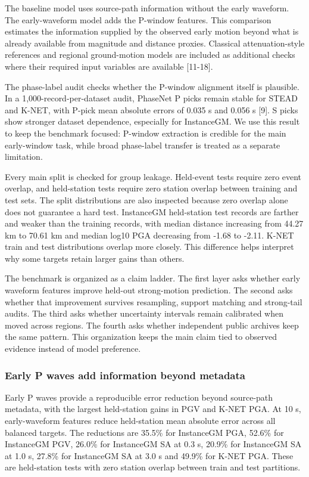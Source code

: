 \documentclass[
  10pt,
]{article}
\begin{document}
The baseline model uses source-path information without the early
waveform. The early-waveform model adds the P-window features. This
comparison estimates the information supplied by the observed early
motion beyond what is already available from magnitude and distance
proxies. Classical attenuation-style references and regional
ground-motion models are included as additional checks where their
required input variables are available {[}11-18{]}.

The phase-label audit checks whether the P-window alignment itself is
plausible. In a 1,000-record-per-dataset audit, PhaseNet P picks remain
stable for STEAD and K-NET, with P-pick mean absolute errors of 0.035 s
and 0.056 s {[}9{]}. S picks show stronger dataset dependence,
especially for InstanceGM. We use this result to keep the benchmark
focused: P-window extraction is credible for the main early-window task,
while broad phase-label transfer is treated as a separate limitation.

Every main split is checked for group leakage. Held-event tests require
zero event overlap, and held-station tests require zero station overlap
between training and test sets. The split distributions are also
inspected because zero overlap alone does not guarantee a hard test.
InstanceGM held-station test records are farther and weaker than the
training records, with median distance increasing from 44.27 km to 70.61
km and median log10 PGA decreasing from -1.68 to -2.11. K-NET train and
test distributions overlap more closely. This difference helps interpret
why some targets retain larger gains than others.

The benchmark is organized as a claim ladder. The first layer asks
whether early waveform features improve held-out strong-motion
prediction. The second asks whether that improvement survives
resampling, support matching and strong-tail audits. The third asks
whether uncertainty intervals remain calibrated when moved across
regions. The fourth asks whether independent public archives keep the
same pattern. This organization keeps the main claim tied to observed
evidence instead of model preference.

\subsubsection{Early P waves add information beyond
metadata}\label{early-p-waves-add-information-beyond-metadata}

Early P waves provide a reproducible error reduction beyond source-path
metadata, with the largest held-station gains in PGV and K-NET PGA. At
10 s, early-waveform features reduce held-station mean absolute error
across all balanced targets. The reductions are 35.5\% for InstanceGM
PGA, 52.6\% for InstanceGM PGV, 26.0\% for InstanceGM SA at 0.3 s,
20.9\% for InstanceGM SA at 1.0 s, 27.8\% for InstanceGM SA at 3.0 s and
49.9\% for K-NET PGA. These are held-station tests with zero station
overlap between train and test partitions.
\end{document}
